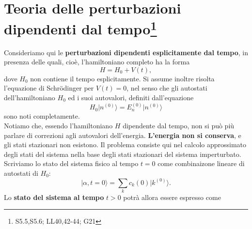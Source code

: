 \documentclass[a4paper,12pt,oneside]{book}
\newcommand*{\myfont}{\fontfamily{ppl}\selectfont}
\begin{document}
\fancypagestyle{plain}{%
\fancyhf{} %
\fancyfoot[C]{\bfseries \myfont{\thepage}} %
\renewcommand{\headrulewidth}{0pt}
\renewcommand{\footrulewidth}{0pt}}

\fancypagestyle{VS}{
\headheight = 15pt
\lhead[\myfont{\textit{\textbf{\thechapter\nouppercase{\leftmark}}}}]{\myfont{\textit{\textbf{\nouppercase{\leftmark}}}}}
\chead[]{}
\rhead[\myfont{\textbf{\thepage}}]{\myfont{\textbf{\thepage}}}

\lfoot[]{}
\cfoot[]{}
\rfoot[]{}
}



\pagestyle{VS}
\setcounter{chapter}{14}
\setcounter{page}{153}
\chapter[T.d.P. dipendenti dal tempo]{Teoria delle perturbazioni dipendenti dal tempo\footnote{ S5.5,S5.6; LL40,42-44; G21}}
Consideriamo qui le \textbf{perturbazioni dipendenti esplicitamente dal tempo}, in presenza delle quali, cioè, l'hamiltoniano completo ha la forma
\begin{equation}
H=H_0+V(t),
\end{equation}
dove $H_0$ non contiene il tempo esplicitamente. Si assume inoltre risolta l'equazione di Schr\"{o}dinger per $V(t)=0$, nel senso che gli autostati dell'hamiltoniano $H_0$ ed i suoi autovalori, definiti dall'equazione
\begin{equation}
H_0 \vert n ^{(0)} \rangle = E_n ^{(0)} \vert n ^{(0)} \rangle 
\end{equation}
sono noti completamente.\\
Notiamo che, essendo l'hamiltoniano $H$ dipendente dal tempo, non si può più parlare di correzioni agli autovalori dell'energia. \textbf{L'energia non si conserva}, e gli stati stazionari non esistono. Il problema consiste qui nel calcolo approssimato degli stati del sistema nella base degli stati stazionari del sistema imperturbato.\\
Scriviamo lo stato del sistema fisico al tempo $t=0$ come combinaizone lineare di autostati di $H_0$:
\begin{equation}
\vert \alpha ,t=0  \rangle = \sum _k c_k (0) \vert k ^{(0)} \rangle .
\label{eq:cap15_1}
\end{equation}
Lo \textbf{stato del sistema al tempo} $t>0$ potrà allora essere espresso come
\end{document}
